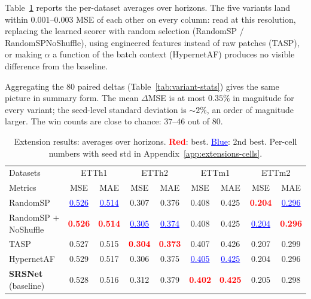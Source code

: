\documentclass[10pt]{article}
\begin{document}
Table~\ref{tab:variant-cells} reports the per-dataset averages over
horizons. The five variants land within $0.001$--$0.003$ MSE of each
other on every column: read at this resolution, replacing the
learned scorer with random selection (RandomSP / RandomSPNoShuffle),
using engineered features instead of raw patches (TASP), or making
$\alpha$ a function of the batch context (HypernetAF) produces no
visible difference from the baseline.

Aggregating the $80$ paired deltas (Table~\ref{tab:variant-stats})
gives the same picture in summary form. The mean $\Delta$MSE is at
most $0.35\%$ in magnitude for every variant; the seed-level
standard deviation is $\sim 2\%$, an order of magnitude larger. The
win counts are close to chance: $37$--$46$ out of $80$.
\begin{table}[t]
  \caption{Extension results: averages over horizons.
    \textcolor{red}{\textbf{Red}}: best.
    \textcolor{blue}{\underline{Blue}}: 2nd best. Per-cell numbers
    with seed std in Appendix~\ref{app:extensions-cells}.}
  \label{tab:variant-cells}
  \begin{center}
  \footnotesize
  \setlength{\tabcolsep}{4pt}
  \begin{tabular}{l|cc|cc|cc|cc}
    \toprule
    Datasets & \multicolumn{2}{c|}{ETTh1} & \multicolumn{2}{c|}{ETTh2}
             & \multicolumn{2}{c|}{ETTm1} & \multicolumn{2}{c}{ETTm2} \\
    Metrics  & MSE & MAE & MSE & MAE & MSE & MAE & MSE & MAE \\
    \midrule
    RandomSP                 & \textcolor{blue}{\underline{0.526}} & \textcolor{blue}{\underline{0.514}} & 0.307 & 0.376 & 0.408 & 0.425 & \textcolor{red}{\textbf{0.204}} & \textcolor{blue}{\underline{0.296}} \\
    RandomSP $+$ NoShuffle   & \textcolor{red}{\textbf{0.526}} & \textcolor{red}{\textbf{0.514}} & \textcolor{blue}{\underline{0.305}} & \textcolor{blue}{\underline{0.374}} & 0.408 & 0.425 & \textcolor{blue}{\underline{0.204}} & \textcolor{red}{\textbf{0.296}} \\
    TASP                     & 0.527 & 0.515 & \textcolor{red}{\textbf{0.304}} & \textcolor{red}{\textbf{0.373}} & 0.407 & 0.426 & 0.207 & 0.299 \\
    HypernetAF               & 0.529 & 0.517 & 0.306 & 0.375 & \textcolor{blue}{\underline{0.405}} & \textcolor{blue}{\underline{0.425}} & 0.204 & 0.296 \\
    \midrule
    \textbf{SRSNet} (baseline) & 0.528 & 0.516 & 0.312 & 0.379 & \textcolor{red}{\textbf{0.402}} & \textcolor{red}{\textbf{0.425}} & 0.205 & 0.298 \\
    \bottomrule
  \end{tabular}
  \end{center}
\end{table}
\end{document}
